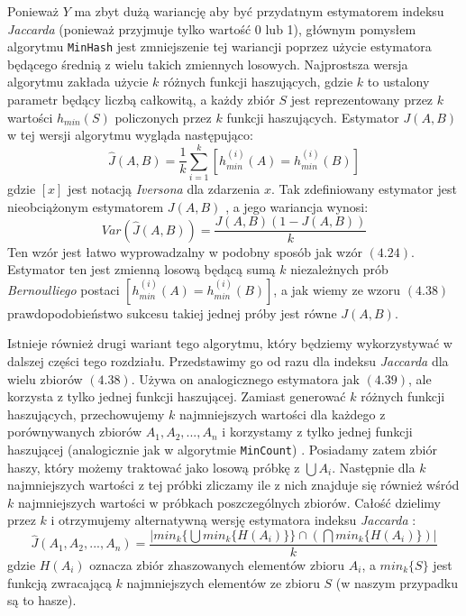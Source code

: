 Ponieważ $Y$ ma zbyt dużą wariancję aby być przydatnym estymatorem indeksu \textit{Jaccarda} (ponieważ przyjmuje tylko wartość 0 lub 1), głównym pomysłem algorytmu \texttt{MinHash} jest zmniejszenie tej wariancji poprzez użycie estymatora będącego średnią z wielu takich zmiennych losowych. Najprostsza wersja algorytmu zakłada użycie $k$ różnych funkcji haszujących, gdzie $k$ to ustalony parametr będący liczbą całkowitą, a każdy zbiór $S$ jest reprezentowany przez $k$ wartości $h_{min}(S)$ policzonych przez $k$ funkcji haszujących.
Estymator $J(A, B)$ w tej wersji algorytmu wygląda następująco:
\begin{equation}
    \hat{J}(A, B) = \frac{1}{k}\sum_{i=1}^{k}[h_{min}^{(i)}(A) = h_{min}^{(i)}(B)]
\end{equation}
gdzie $[x]$ jest notacją \textit{Iversona} dla zdarzenia $x$. Tak zdefiniowany estymator jest nieobciążonym estymatorem $J(A, B)$ \cite{minhash}, a jego wariancja wynosi:
\begin{equation}
    Var(\hat{J}(A,B)) = \frac{J(A, B)(1 - J(A, B))}{k}
\end{equation}
Ten wzór jest łatwo wyprowadzalny w podobny sposób jak wzór $(4.24)$. Estymator ten jest zmienną losową będącą sumą $k$ niezależnych prób \textit{Bernoulliego} postaci $[h_{min}^{(i)}(A) = h_{min}^{(i)}(B)]$, a jak wiemy ze wzoru $(4.38)$ prawdopodobieństwo sukcesu takiej jednej próby jest równe $J(A, B)$.

Istnieje również drugi wariant tego algorytmu, który będziemy wykorzystywać w dalszej części tego rozdziału. Przedstawimy go od razu dla indeksu \textit{Jaccarda} dla wielu zbiorów $(4.38)$. Używa on analogicznego estymatora jak $(4.39)$, ale korzysta z tylko jednej funkcji haszującej. Zamiast generować $k$ różnych funkcji haszujących, przechowujemy $k$ najmniejszych wartości dla każdego z porównywanych zbiorów $A_1, A_2, ..., A_n$ i korzystamy z tylko jednej funkcji haszującej (analogicznie jak w algorytmie \texttt{MinCount}) \cite{adroll}. Posiadamy zatem zbiór haszy, który możemy traktować jako losową próbkę z $\bigcup A_i$. Następnie dla $k$ najmniejszych wartości z tej próbki zliczamy ile z nich znajduje się również wśród $k$ najmniejszych wartości w próbkach poszczególnych zbiorów. Całość dzielimy przez $k$ i otrzymujemy alternatywną wersję estymatora indeksu \textit{Jaccarda} \cite{adroll}:
\begin{equation}
    \hat{J}(A_1, A_2, ..., A_n) = \frac{|min_{k}\{\bigcup min_{k} \{ H(A_i) \} \} \cap (\bigcap min_{k}\{H(A_i)\})|}{k}
\end{equation}
gdzie $H(A_i)$ oznacza zbiór zhaszowanych elementów zbioru $A_i$, a $min_{k}\{S\}$ jest funkcją zwracającą $k$ najmniejszych elementów ze zbioru $S$ (w naszym przypadku są to hasze).

